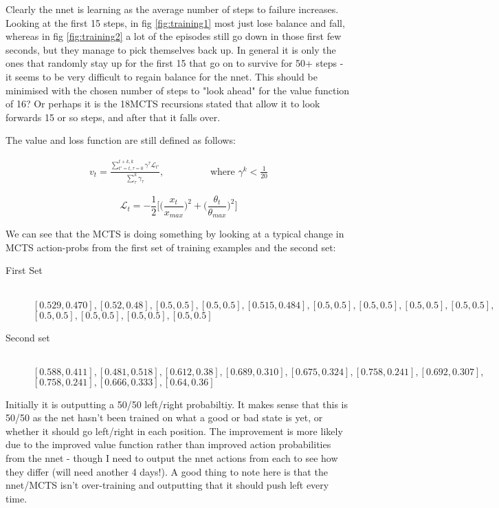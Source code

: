 \documentclass[11.7pt]{article}
\newcommand{\loss}{\mathcal{L}}
\begin{document}
Clearly the nnet is learning as the average number of steps to failure increases. Looking at the first 15 steps, in fig \ref{fig:training1} most just lose balance and fall, whereas in fig \ref{fig:training2} a lot of the episodes still go down in those first few seconds, but they manage to pick themselves back up. In general it is only the ones that randomly stay up for the first 15 that go on to survive for 50+ steps - it seems to be very difficult to regain balance for the nnet. This should be minimised with the chosen number of steps to "look ahead" for the value function of 16? Or perhaps it is the 18MCTS recursions stated that allow it to look forwards 15 or so steps, and after that it falls over.

The value and loss function are still defined as follows:

\begin{align}
   v_t = \frac{\sum_{t'=t, \tau=0}^{t+k, k} \gamma^\tau \loss_{t'} }{\sum_{\tau}^k \gamma_\tau}, \hspace{2cm} \text{where } \gamma^k < \frac{1}{20}
\end{align}

\begin{equation}
   \loss_t = - \frac{1}{2} \bigg[ \Big(\frac{x_t}{x_{max}}\Big)^2 + \Big(\frac{\theta_t}{\theta_{max}}\Big)^2 \bigg]
\end{equation}

We can see that the MCTS is doing something by looking at a typical change in MCTS action-probs from the first set of training examples and the second set:

\begin{description}
   \item[First Set] \hfill \\
   $[0.529, 0.470], [0.52, 0.48], [0.5, 0.5], [0.5, 0.5], [0.515, 0.484], [0.5, 0.5], [0.5, 0.5], [0.5, 0.5], [0.5, 0.5], $ \\
   $ [0.5, 0.5], [0.5, 0.5], [0.5, 0.5], [0.5, 0.5]$
   \item[Second set] \hfill \\
   $[0.588, 0.411], [0.481, 0.518], [0.612, 0.38], [0.689, 0.310], [0.675, 0.324],[0.758, 0.241], [0.692, 0.307],$ \\ $[0.758, 0.241], [0.666, 0.333], [0.64, 0.36]$
\end{description}

Initially it is outputting a 50/50 left/right probabiltiy. It makes sense that this is 50/50 as the net hasn't been trained on what a good or bad state is yet, or whether it should go left/right in each position. The improvement is more likely due to the improved value function rather than improved action probabilities from the nnet - though I need to output the nnet actions from each to see how they differ (will need another 4 days!). A good thing to note here is that the nnet/MCTS isn't over-training and outputting that it should push left every time.
\end{document}

